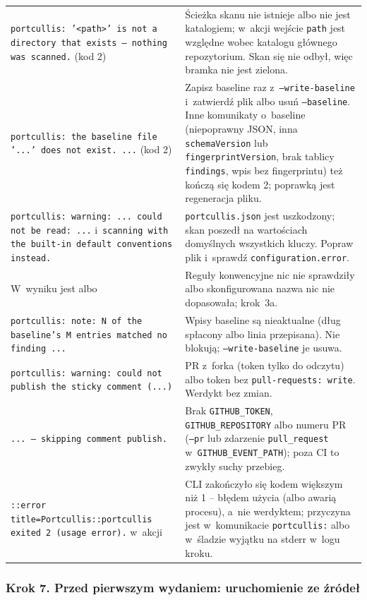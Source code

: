 \begin{xltabular}{\linewidth}{@{}>{\raggedright\arraybackslash}p{4.6cm} >{\raggedright\arraybackslash}X@{}}
\texttt{portcullis: '<path>' is not a directory that exists — nothing was scanned.} (kod 2) & Ścieżka skanu nie istnieje albo nie jest katalogiem; w~akcji wejście \texttt{path} jest względne wobec katalogu głównego repozytorium. Skan się nie odbył, więc bramka nie jest zielona. \\
\texttt{portcullis: the baseline file '...' does not exist. ...} (kod 2) & Zapisz baseline raz z~\texttt{--write-baseline} i~zatwierdź plik albo usuń \texttt{--baseline}. Inne komunikaty o~baseline (niepoprawny JSON, inna \texttt{schemaVersion} lub \texttt{fingerprintVersion}, brak tablicy \texttt{findings}, wpis bez fingerprintu) też kończą się kodem 2; poprawką jest regeneracja pliku. \\
\texttt{portcullis: warning: ... could not be read: ...} i~\texttt{scanning with the built-in default conventions instead.} & \texttt{portcullis.json} jest uszkodzony; skan poszedł na wartościach domyślnych wszystkich kluczy. Popraw plik i~sprawdź \texttt{configuration.error}. \\
W~wyniku jest  albo  & Reguły konwencyjne nic nie sprawdziły albo skonfigurowana nazwa nic nie dopasowała; krok~3a. \\
\texttt{portcullis: note: N of the baseline's M entries matched no finding ...} & Wpisy baseline są nieaktualne (dług spłacony albo linia przepisana). Nie blokują; \texttt{--write-baseline} je usuwa. \\
\texttt{portcullis: warning: could not publish the sticky comment (...)} & PR z~forka (token tylko do odczytu) albo token bez \texttt{pull-requests: write}. Werdykt bez zmian. \\
\texttt{... — skipping comment publish.} & Brak \texttt{GITHUB\_TOKEN}, \texttt{GITHUB\_REPOSITORY} albo numeru PR (\texttt{--pr} lub zdarzenie \texttt{pull\_request} w~\texttt{GITHUB\_EVENT\_PATH}); poza CI to zwykły suchy przebieg. \\
\texttt{::error title=Portcullis::\allowbreak portcullis exited 2 (usage error).} w~akcji & CLI zakończyło się kodem większym niż 1 -- błędem użycia (albo awarią procesu), a~nie werdyktem; przyczyna jest w~komunikacie \texttt{portcullis:} albo w~śladzie wyjątku na stderr w~logu kroku. \\
\bottomrule
\end{xltabular}
\endgroup

\subsubsection{Krok 7. Przed pierwszym wydaniem: uruchomienie ze źródeł}

